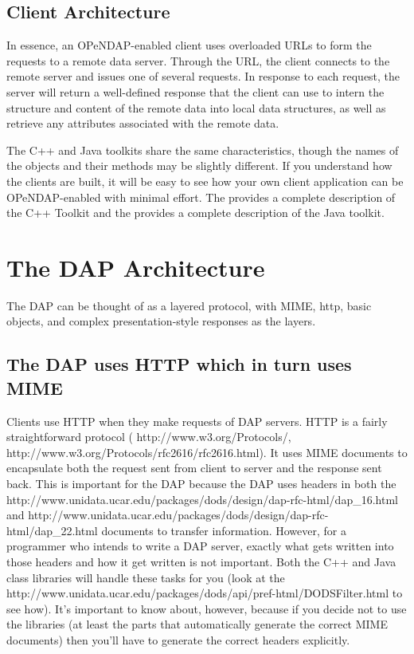 \documentclass{dods-paper}
\begin{document}
\subsection{Client Architecture}  

In essence, an OPeNDAP-enabled client uses overloaded URLs to form the 
requests to a remote data server.  Through the URL, the client connects to 
the remote server and issues one of several requests.   In response to
each request, the server will return a well-defined response that the client
can use to intern the structure and content of the remote data into local
data structures, as well as retrieve any attributes associated with the
remote data.

The C++ and Java toolkits share the same characteristics, though the 
names of the objects and their methods may be slightly different. If you 
understand how the clients are built, it will be easy to see how your 
own client application can be OPeNDAP-enabled with minimal effort. 
The 
provides a complete description of the C++ Toolkit and
the  
provides a complete description of the Java toolkit.

\section{The DAP Architecture}

The DAP can be thought of as a layered protocol, with MIME, http, basic objects,
and complex presentation-style responses as the layers.

\subsection{The DAP uses HTTP which in turn uses MIME}

 
Clients use HTTP when they make requests of DAP servers. HTTP is a
fairly straightforward protocol (
{http://www.w3.org/Protocols/},  {http://www.w3.org/Protocols/rfc2616/rfc2616.html}).  It uses
MIME documents to encapsulate both the request sent from client to
server and the response sent back. This is important for the DAP
because the DAP uses headers in both the 
{http://www.unidata.ucar.edu/packages/dods/design/dap-rfc-html/dap\_16.html}
and 
{http://www.unidata.ucar.edu/packages/dods/design/dap-rfc-html/dap\_22.html}
documents to transfer information.  However, for a programmer who
intends to write a DAP server, exactly what gets written into those
headers and how it get written is not important.  Both the C++ and
Java class libraries will handle these tasks for you (look at the
{http://www.unidata.ucar.edu/packages/dods/api/pref-html/DODSFilter.html}
to see how). It's important to know about, however, because if you
decide not to use the libraries (at least the parts that automatically
generate the correct MIME documents) then you'll have to generate the
correct headers explicitly.
\end{document}

